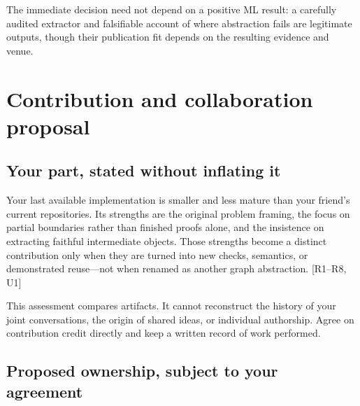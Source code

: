 \documentclass[
  10pt,
]{article}
\begin{document}
The immediate decision need not depend on a positive ML result: a
carefully audited extractor and falsifiable account of where abstraction
fails are legitimate outputs, though their publication fit depends on
the resulting evidence and venue.

\section{Contribution and collaboration
proposal}\label{contribution-and-collaboration-proposal}

\subsection{Your part, stated without inflating
it}\label{your-part-stated-without-inflating-it}

Your last available implementation is smaller and less mature than your
friend's current repositories. Its strengths are the original problem
framing, the focus on partial boundaries rather than finished proofs
alone, and the insistence on extracting faithful intermediate objects.
Those strengths become a distinct contribution only when they are turned
into new checks, semantics, or demonstrated reuse---not when renamed as
another graph abstraction. {[}R1--R8, U1{]}

This assessment compares artifacts. It cannot reconstruct the history of
your joint conversations, the origin of shared ideas, or individual
authorship. Agree on contribution credit directly and keep a written
record of work performed.

\subsection{Proposed ownership, subject to your
agreement}\label{proposed-ownership-subject-to-your-agreement}
\end{document}
